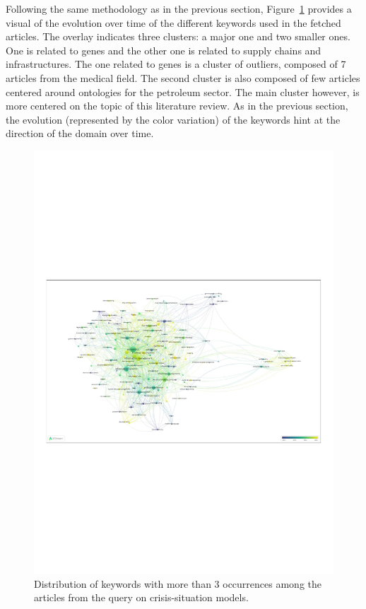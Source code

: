 Following the same methodology as in the previous section, Figure~\ref{literature:/situation-models-overlay} provides a visual of the evolution over time of the different keywords used in the fetched articles.
The overlay indicates three clusters: a major one and two smaller ones.
One is related to genes and the other one is related to supply chains and infrastructures.
The one related to genes is a cluster of outliers, composed of 7 articles from the medical field.
The second cluster is also composed of few articles centered around ontologies for the petroleum sector.
The main cluster however, is more centered on the topic of this literature review.
As in the previous section, the evolution (represented by the color variation) of the keywords hint at the direction of the domain over time.

\begin{figure}[bp]
    \includegraphics[width=\paperwidth,height=\paperheight,keepaspectratio, angle=90]{figures/chap-2/situation-models-overlay.pdf}
    \caption{Distribution of keywords with more than 3 occurrences among the articles from the query on crisis-situation models.}
    \label{literature:/situation-models-overlay}
\end{figure}

